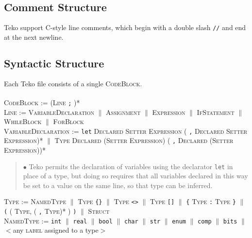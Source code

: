 \documentclass{article}
\newcommand{\code}[1]{\colorbox{light-gray}{\texttt{#1}}}
\begin{document}
\subsection{Comment Structure}

Teko support C-style line comments, which begin with a double slash \code{//} and end at the next newline. \\

\subsection{Syntactic Structure}

Each Teko file consists of a single \textsc{CodeBlock}. \\ \\

\textsc{CodeBlock} := (\textsc{Line} \code{;} )* \\

\textsc{Line} := \textsc{VariableDeclaration} $\|$ \textsc{Assignment} $\|$ \textsc{Expression} $\|$ \textsc{IfStatement} $\|$ \textsc{WhileBlock} $\|$ \textsc{ForBlock} \\

\textsc{VariableDeclaration} := \code{let} \textsc{Declared} \textsc{Setter} \textsc{Expression} ( \code{,} \textsc{Declared} \textsc{Setter} \textsc{Expression})* $\|$ \textsc{Type} \textsc{Declared} (\textsc{Setter} \textsc{Expression}) ( \code{,} \textsc{Declared} (\textsc{Setter} \textsc{Expression}))* 

\begin{quote} $\bullet$ Teko permits the declaration of variables using the declarator \code{let} in place of a type, but doing so requires that all variables declared in this way be set to a value on the same line, so that type can be inferred. \end{quote}

\textsc{Type} := \textsc{NamedType} $\|$ \textsc{Type} \code{\{\}} $\|$ \textsc{Type} \code{<>} $\|$ \textsc{Type} \code{[]} $\|$ \code{\{} \textsc{Type} \code{:} \textsc{Type} \code{\}} $\|$ \code{(} ( \textsc{Type}, ( \code{,} \textsc{Type})* ) \code{)} $\|$ \textsc{Struct} \\

\textsc{NamedType} := \code{int} $\|$ \code{real} $\|$ \code{bool} $\|$ \code{char} $\|$ \code{str} $\|$ \code{enum} $\|$ \code{comp} $\|$ \code{bits} $\|$ $<$any \textsc{label} assigned to a type$>$ \\
\end{document}
